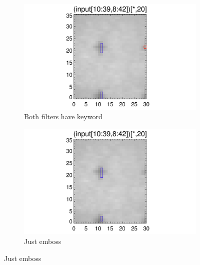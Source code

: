\documentclass[10pt]{article}
\begin{document}
\begin{figure}[!h]
    \centering 
    \begin{subfigure}[b]{.45\linewidth}
        \centering
        \includegraphics[width=1.3\textwidth]{plots_tables_images/fidcheck_withbothtruncate1.png}
        \caption{Both filters have keyword}
    \end{subfigure}
    \begin{subfigure}[b]{.45\linewidth}
        \centering
        \includegraphics[width=1.3\textwidth]{plots_tables_images/fidcheck_withembosstruncate1.png}
        \caption{Just emboss}
    \end{subfigure}
   

\end{figure}
\end{document}
